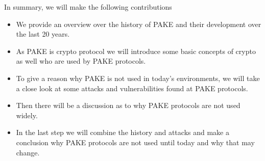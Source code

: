 \documentclass[journal]{IEEEtran}
\begin{document}
In summary, we will make the following contributions
\begin{itemize}[]
    \item We provide an overview over the history of PAKE and their development over the last 20 years.
    \item As PAKE is crypto protocol we will introduce some basic concepts of crypto as well who are used by PAKE protocols.
    \item To give a reason why PAKE is not used in today's environments, we will take a close look at some attacks and vulnerabilities found at PAKE protocols.
    \item Then there will be a discussion as to why PAKE protocols are not used widely. 
    \item In the last step we will combine the history and attacks and make a conclusion why PAKE protocols are not used until today and why that may change.
\end{itemize}
\end{document}
